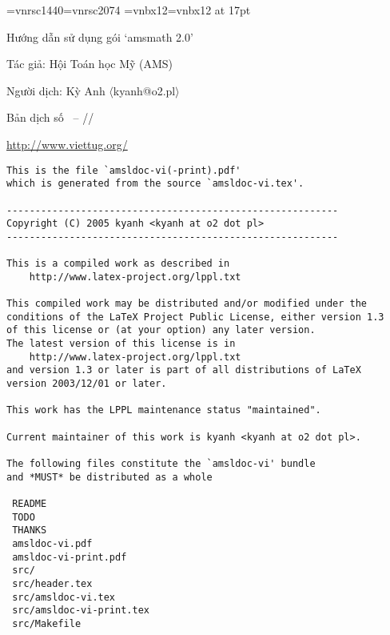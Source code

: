 

\pagestyle{headings}




\thispagestyle{empty}

\begingroup
	{\font\mysign=vnrsc1440\relax\font\ftitle=vnrsc2074}%
	{\font\mysign=vnbx12\relax\font\ftitle=vnbx12 at 17pt}
	\null
	\vskip6cm
	\centerline{\ftitle Hướng dẫn sử dụng gói `amsmath 2.0'}
	\vskip30mm
	\centerline{\mysign	Tác giả: Hội Toán học Mỹ (AMS)}
	\vskip3mm
	\centerline{\mysign Người dịch: Kỳ Anh $\langle${kyanh@o2.pl}$\rangle$}
	\vskip25mm
	\centerline{\Large Bản dịch số
		{\mysign\the\buildnum\ -- \the\year/\the\month/\the\day}}
	\vfill
	\centerline{\LARGE\url{http://www.viettug.org/}}
\endgroup

\newpage

\begin{verbatim}
This is the file `amsldoc-vi(-print).pdf'
which is generated from the source `amsldoc-vi.tex'.

----------------------------------------------------------
Copyright (C) 2005 kyanh <kyanh at o2 dot pl>
----------------------------------------------------------

This is a compiled work as described in
    http://www.latex-project.org/lppl.txt

This compiled work may be distributed and/or modified under the
conditions of the LaTeX Project Public License, either version 1.3
of this license or (at your option) any later version.
The latest version of this license is in
    http://www.latex-project.org/lppl.txt
and version 1.3 or later is part of all distributions of LaTeX
version 2003/12/01 or later.

This work has the LPPL maintenance status "maintained".

Current maintainer of this work is kyanh <kyanh at o2 dot pl>.

The following files constitute the `amsldoc-vi' bundle
and *MUST* be distributed as a whole

 README
 TODO
 THANKS
 amsldoc-vi.pdf
 amsldoc-vi-print.pdf
 src/
 src/header.tex
 src/amsldoc-vi.tex
 src/amsldoc-vi-print.tex
 src/Makefile
\end{verbatim}

\ifx\printversion\undefined
	\newpage
\else
	\cleardoublepage
\fi

